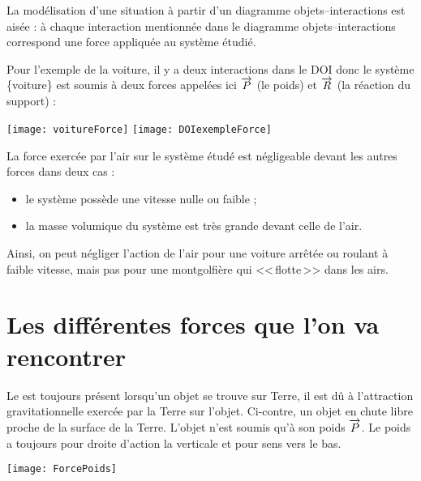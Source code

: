 \begin{aconnaitre}
La modélisation d'une situation à partir d'un diagramme objets--interactions est aisée : à chaque interaction mentionnée dans le diagramme objets--interactions correspond une force appliquée au système étudié.
\end{aconnaitre}

\vspace{1em}

Pour l'exemple de la voiture, il y a deux interactions dans le DOI donc le système \{voiture\} est soumis à deux forces appelées ici $\overrightarrow{P}$ (le poids) et $\overrightarrow{R}$ (la réaction du support) :

\begin{center}
    \texttt{[image: voitureForce]}%
    \hfill%
    \texttt{[image: DOIexempleForce]}
\end{center}



\begin{aconnaitre}
La force exercée par l'air sur le système étudé est négligeable devant les autres forces dans deux cas :
\begin{itemize}
    \item le système possède une vitesse nulle ou faible ;
    \item la masse volumique du système est très grande devant celle de l'air.
\end{itemize}

\vspace{.5em}
Ainsi, on peut négliger l'action de l'air pour une voiture arrêtée ou roulant à faible vitesse, mais pas pour une montgolfière qui <<\,flotte\,>> dans les airs.  
\end{aconnaitre}





\section{Les différentes forces que l'on va rencontrer}

\begin{minipage}[c]{.65\linewidth}
Le \textbf{} est toujours présent lorsqu'un objet se trouve sur Terre, il est dû à l'attraction gravitationnelle exercée par la Terre sur l'objet. Ci-contre, un objet en chute libre proche de la surface de la Terre. L'objet n'est soumis qu'à son poids $\overrightarrow{P}$. Le poids a toujours pour droite d'action la verticale et pour sens vers le bas.
\end{minipage}\hfill%
\begin{minipage}[c]{.33\linewidth}
\begin{center}
    \texttt{[image: ForcePoids]}
\end{center}
\end{minipage}

